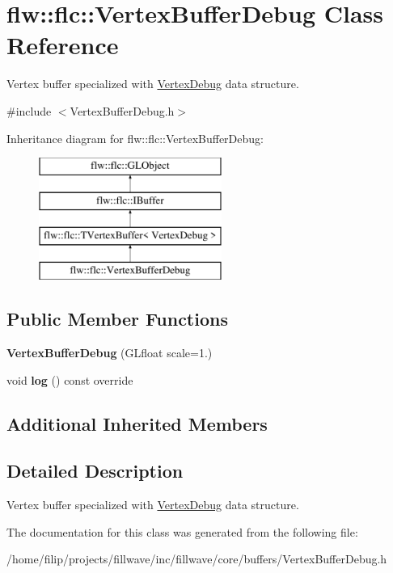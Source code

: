 \hypertarget{classflw_1_1flc_1_1VertexBufferDebug}{}\section{flw\+:\+:flc\+:\+:Vertex\+Buffer\+Debug Class Reference}
\label{classflw_1_1flc_1_1VertexBufferDebug}


Vertex buffer specialized with \hyperlink{structflw_1_1flc_1_1VertexDebug}{Vertex\+Debug} data structure.  




{\ttfamily \#include $<$Vertex\+Buffer\+Debug.\+h$>$}

Inheritance diagram for flw\+:\+:flc\+:\+:Vertex\+Buffer\+Debug\+:\begin{figure}[H]
\begin{center}
\leavevmode
\includegraphics[height=4.000000cm]{classflw_1_1flc_1_1VertexBufferDebug}
\end{center}
\end{figure}
\subsection*{Public Member Functions}
\begin{DoxyCompactItemize}
\item 
\mbox{\label{classflw_1_1flc_1_1VertexBufferDebug_a4a87d4c29bc2b8d99f84a4f005f2d8bd}} 
{\bfseries Vertex\+Buffer\+Debug} (G\+Lfloat scale=1.)
\item 
\mbox{\label{classflw_1_1flc_1_1VertexBufferDebug_a75376a3b92cee18edf4e88ee34d8bc62}} 
void {\bfseries log} () const override
\end{DoxyCompactItemize}
\subsection*{Additional Inherited Members}


\subsection{Detailed Description}
Vertex buffer specialized with \hyperlink{structflw_1_1flc_1_1VertexDebug}{Vertex\+Debug} data structure. 

The documentation for this class was generated from the following file\+:\begin{DoxyCompactItemize}
\item 
/home/filip/projects/fillwave/inc/fillwave/core/buffers/Vertex\+Buffer\+Debug.\+h\end{DoxyCompactItemize}
